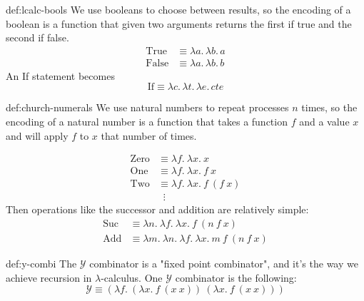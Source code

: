 \documentclass[landscape, 8pt]{extarticle}
\begin{document}
\begin{multicols}{3}
\begin{dfn}[Booleans]{def:lcalc-bools}{}
We use booleans to choose between results, so the encoding of a boolean is a function that given two arguments returns the first if true and the second if false.
\begin{align*}
    \text{True} &\equiv \lambda a. \, \lambda b. \, a \\
    \text{False} &\equiv \lambda a. \, \lambda b. \, b
\end{align*}
An If statement becomes
\[\text{If} \equiv \lambda c . \, \lambda t. \, \lambda e. \, cte\]
\end{dfn}

\begin{dfn}{def:church-numerals}{}
We use natural numbers to repeat processes $n$ times, so the encoding of a natural number is a function that takes a function $f$ and a value $x$ and will apply $f$ to $x$ that number of times.

\begin{equation}
\begin{aligned}
    \text{Zero} &\equiv \lambda f. \: \lambda x. \: x \nonumber \\
    \text{One}  &\equiv \lambda f. \: \lambda x. \: f \: x \nonumber \\
    \text{Two}  &\equiv \lambda f. \: \lambda x. \: f \: (f \: x) \nonumber \\
                &\;\;\vdots
\end{aligned}
\end{equation}
\newline
Then operations like the successor and addition are relatively simple:
\begin{equation}
\begin{aligned}
    \text{Suc} &\equiv \lambda n. \: \lambda f. \: \lambda x. \: f \: (n\:f\:x) \nonumber \\
    \text{Add}  &\equiv \lambda m. \: \lambda n. \: \lambda f. \: \lambda x. \: m \: f \: (n \: f \: x) \nonumber
\end{aligned}
\end{equation}
\end{dfn}

\begin{dfn}{def:y-combi}{}
The $\mathcal{Y}$ combinator is a "fixed point combinator", and it's the way we achieve recursion in $\lambda$-calculus. One $\mathcal{Y}$ combinator is the following:
\[\mathcal{Y} \equiv (\lambda f. \: (\lambda x. \: f \: (x \: x)) \: (\lambda x. \: f \: (x \: x)))\]
\end{dfn}


\end{multicols}
\end{document}
